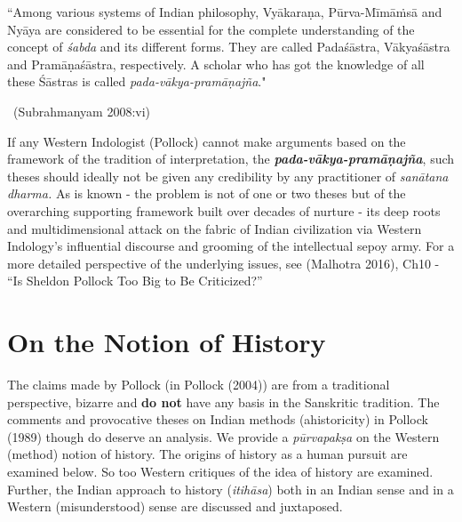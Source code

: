 \begin{myquote}
“Among various systems of Indian philosophy, Vyākaraṇa, Pūrva-Mīmāṁsā and Nyāya are considered to be essential for the complete understanding of the concept of \textit{śabda} and its different forms. They are called Padaśāstra, Vākyaśāstra and Pramāṇaśāstra, respectively. A scholar who has got the knowledge of all these Śāstras is called \textit{pada-vākya-pramāṇajña}."

~\hfill (Subrahmanyam 2008:vi)
\end{myquote}

\vskip 3pt

If any Western Indologist (Pollock) cannot make arguments based on the framework of the tradition of interpretation, the \textit{\textbf{pada-vākya-pramāṇajña}}, such theses should ideally not be given any credibility by any practitioner of \textit{sanātana dharma.} As is known - the problem is not of one or two theses but of the overarching supporting framework built over decades of nurture - its deep roots and multidimensional attack on the fabric of Indian civilization via Western Indology’s influential discourse and grooming of the intellectual sepoy army. For a more detailed perspective of the underlying issues, see (Malhotra 2016), Ch10 - “Is Sheldon Pollock Too Big to Be Criticized?”


\section*{On the Notion of History}

The claims made by Pollock (in Pollock (2004)) are from a traditional perspective, bizarre and \textbf{do not} have any basis in the Sanskritic tradition. The comments and provocative theses on Indian methods (ahistoricity) in Pollock (1989) though do deserve an analysis. We provide a \textit{pūrvapakṣa} on the Western (method) notion of history. The origins of history as a human pursuit are examined below. So too Western critiques of the idea of history are examined. Further, the Indian approach to history (\textit{itihāsa}) both in an Indian sense and in a Western (misunderstood) sense are discussed and juxtaposed.

\vskip 3pt

